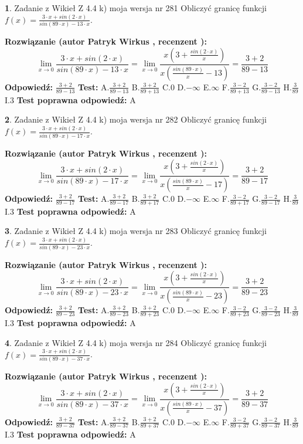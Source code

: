 \documentclass[12pt, a4paper]{article}
\theoremstyle{definition} %
\newtheorem{zad}{}
\newcommand{\zadStart}[1]{\begin{zad}#1\newline}
\newcommand{\zadStop}{\end{zad}}
\newcommand{\rozwStart}[2]{\noindent \textbf{Rozwiązanie (autor #1 , recenzent #2): }\newline}
\newcommand{\rozwStop}{\newline}
\newcommand{\odpStart}{\noindent \textbf{Odpowiedź:}\newline}
\newcommand{\odpStop}{\newline}
\newcommand{\testStart}{\noindent \textbf{Test:}\newline}
\newcommand{\testStop}{\newline}
\newcommand{\kluczStart}{\noindent \textbf{Test poprawna odpowiedź:}\newline}
\newcommand{\kluczStop}{\newline}
\begin{document}
\zadStart{Zadanie z Wikieł Z 4.4 k) moja wersja nr 281}
Obliczyć granicę funkcji $f(x)=\frac{3\cdot x +sin(2\cdot x)}{sin(89\cdot x) -13\cdot x}$.
\zadStop
\rozwStart{Patryk Wirkus}{}
$$\lim\limits_{x\to 0}\frac{3\cdot x +sin(2\cdot x)}{sin(89\cdot x) -13\cdot x}
=\lim\limits_{x\to 0}\frac{x(3+\frac{sin(2\cdot x)}{x})}{x(\frac{sin(89\cdot x)}{x}-13)}
=\frac{3+2}{89-13}$$
\rozwStop
\odpStart
$\frac{3+2}{89-13}$
\odpStop
\testStart
A.$\frac{3+2}{89-13}$
B.$\frac{3+2}{89+13}$
C.$0$
D.$-\infty$
E.$\infty$
F.$\frac{3-2}{89+13}$
G.$\frac{3-2}{89-13}$
H.$\frac{3}{89}$
I.$3$
\testStop
\kluczStart
A
\kluczStop



\zadStart{Zadanie z Wikieł Z 4.4 k) moja wersja nr 282}
Obliczyć granicę funkcji $f(x)=\frac{3\cdot x +sin(2\cdot x)}{sin(89\cdot x) -17\cdot x}$.
\zadStop
\rozwStart{Patryk Wirkus}{}
$$\lim\limits_{x\to 0}\frac{3\cdot x +sin(2\cdot x)}{sin(89\cdot x) -17\cdot x}
=\lim\limits_{x\to 0}\frac{x(3+\frac{sin(2\cdot x)}{x})}{x(\frac{sin(89\cdot x)}{x}-17)}
=\frac{3+2}{89-17}$$
\rozwStop
\odpStart
$\frac{3+2}{89-17}$
\odpStop
\testStart
A.$\frac{3+2}{89-17}$
B.$\frac{3+2}{89+17}$
C.$0$
D.$-\infty$
E.$\infty$
F.$\frac{3-2}{89+17}$
G.$\frac{3-2}{89-17}$
H.$\frac{3}{89}$
I.$3$
\testStop
\kluczStart
A
\kluczStop



\zadStart{Zadanie z Wikieł Z 4.4 k) moja wersja nr 283}
Obliczyć granicę funkcji $f(x)=\frac{3\cdot x +sin(2\cdot x)}{sin(89\cdot x) -23\cdot x}$.
\zadStop
\rozwStart{Patryk Wirkus}{}
$$\lim\limits_{x\to 0}\frac{3\cdot x +sin(2\cdot x)}{sin(89\cdot x) -23\cdot x}
=\lim\limits_{x\to 0}\frac{x(3+\frac{sin(2\cdot x)}{x})}{x(\frac{sin(89\cdot x)}{x}-23)}
=\frac{3+2}{89-23}$$
\rozwStop
\odpStart
$\frac{3+2}{89-23}$
\odpStop
\testStart
A.$\frac{3+2}{89-23}$
B.$\frac{3+2}{89+23}$
C.$0$
D.$-\infty$
E.$\infty$
F.$\frac{3-2}{89+23}$
G.$\frac{3-2}{89-23}$
H.$\frac{3}{89}$
I.$3$
\testStop
\kluczStart
A
\kluczStop



\zadStart{Zadanie z Wikieł Z 4.4 k) moja wersja nr 284}
Obliczyć granicę funkcji $f(x)=\frac{3\cdot x +sin(2\cdot x)}{sin(89\cdot x) -37\cdot x}$.
\zadStop
\rozwStart{Patryk Wirkus}{}
$$\lim\limits_{x\to 0}\frac{3\cdot x +sin(2\cdot x)}{sin(89\cdot x) -37\cdot x}
=\lim\limits_{x\to 0}\frac{x(3+\frac{sin(2\cdot x)}{x})}{x(\frac{sin(89\cdot x)}{x}-37)}
=\frac{3+2}{89-37}$$
\rozwStop
\odpStart
$\frac{3+2}{89-37}$
\odpStop
\testStart
A.$\frac{3+2}{89-37}$
B.$\frac{3+2}{89+37}$
C.$0$
D.$-\infty$
E.$\infty$
F.$\frac{3-2}{89+37}$
G.$\frac{3-2}{89-37}$
H.$\frac{3}{89}$
I.$3$
\testStop
\kluczStart
A
\kluczStop
\end{document}

